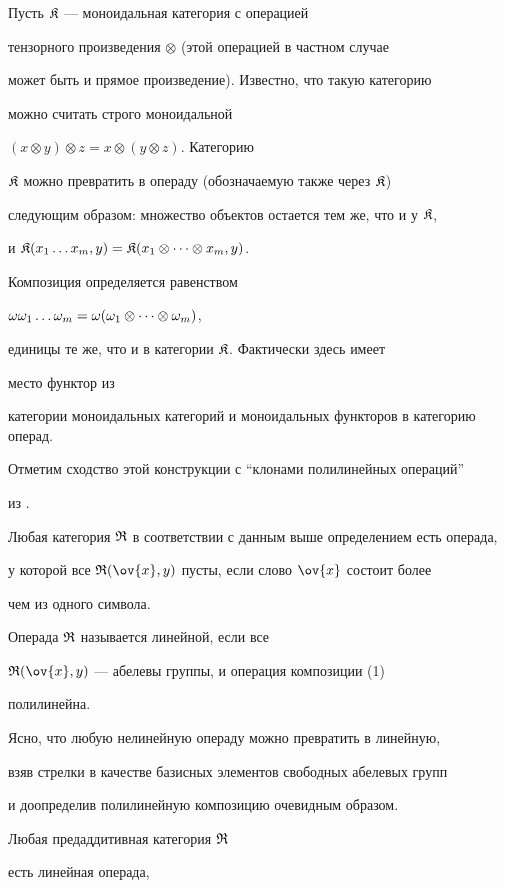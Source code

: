 \begin{exam}


Пусть ${\frak K}$ --- моноидальная категория с операцией


тензорного произведения $\otimes$ (этой операцией в частном случае


может быть и прямое произведение). Известно, что такую категорию


можно считать строго моноидальной


$(x\otimes y)\otimes z=x\otimes (y\otimes z)$. Категорию


${\frak K}$ можно превратить в операду (обозначаемую также через ${\frak K}$)


следующим образом: множество объектов остается тем же, что и у ${\frak K}$,


и ${\frak K}(x_1\dotsc x_m,y)={\frak K}(x_1\otimes \dotsb\otimes x_m,y)$.


Композиция определяется равенством


$\omega\omega_1\dotsc\omega_m=\omega(\omega_1\otimes\dotsb \otimes \omega_m)$,


единицы те же, что и в категории ${\frak K}$. Фактически здесь имеет


место функтор из


категории моноидальных категорий и моноидальных функторов в категорию операд.


Отметим сходство этой конструкции с ``клонами полилинейных операций''


из \cite{Art}.





Любая категория ${\frak R}$ в соответствии с данным выше определением есть операда,


у которой все $\R(\ov{x},y)$ пусты, если слово $\ov{x}$ состоит более


чем из одного символа.


Операда ${\frak R}$ называется линейной, если все


$\R(\ov{x},y)$ --- абелевы группы, и операция композиции (1)


полилинейна.


Ясно, что любую нелинейную операду можно превратить в линейную,


взяв стрелки в качестве базисных элементов свободных абелевых групп


и доопределив полилинейную композицию очевидным образом.


Любая предаддитивная категория ${\frak R}$


есть линейная операда,



\end{exam}
